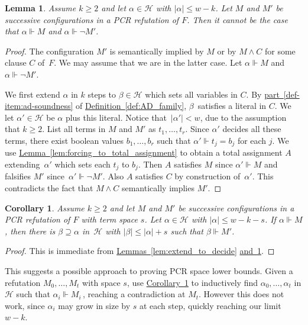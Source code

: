 \documentclass[11pt]{article}
\numberwithin{equation}{section}
\newtheorem{lemma}[theorem]{Lemma}
\newtheorem{corollary}[theorem]{Corollary}
\theoremstyle{definition}
\theoremstyle{plain}
\newcommand{\expref}[2]{\hyperref[#2]{#1~\ref{#2}}}
\newcommand\calH{\mathcal{H}}
\begin{document}
\begin{lemma}\label{lem:forcing-soundness}
Assume $k \ge 2$ and let $\alpha \in \calH$ with $|\alpha| \le w-k$. 
Let $M$ and $M'$ be successive configurations in a PCR refutation of $F$.
Then it cannot be the case that $\alpha \Vdash M$ and $\alpha \Vdash \neg M'$.
\end{lemma}

\begin{proof}
The configuration $M'$ is semantically implied by $M$ or by 
$M \land C$ for some clause $C$ of~$F$. 
We may assume that we are in the latter case.
Let $\alpha \Vdash M$ and $\alpha \Vdash \neg M'$.
 
We first extend $\alpha$ in 
$k$ steps to $\beta \in \calH$ which sets all variables in $C$.
By \expref{part}{def-item:ad-soundness}
of \expref{Definition}{def:AD_family}, $\beta$~satisfies a literal in $C$.
We let $\alpha' \in \calH$ be $\alpha$ plus this literal. 
Notice that~$|\alpha'| < w$, due to the assumption that $k \ge 2$.
List all terms in $M$ and $M'$ as $t_1, \ldots, t_r$.
Since $\alpha'$ decides all these terms, 
there exist boolean values $b_1, \ldots, b_{r}$ such that
$\alpha' \Vdash t_j = b_j$ for each $j$. 
We use \expref{Lemma}{lem:forcing_to_total_assignment}
to obtain a total assignment $A$ extending~$\alpha'$ 
which sets each $t_j$ to $b_j$. 
Then $A$ satisfies $M$ since $\alpha' \Vdash M$ 
and falsifies $M'$ since~$\alpha' \Vdash \neg M'$.
Also $A$ satisfies $C$
by  construction of~$\alpha'$. This contradicts
the fact that $M \wedge C$ semantically implies $M'$.
\end{proof}



\begin{corollary} \label{cor:extend_one_step}
Assume $k \ge 2$ and let $M$ and $M'$ be successive configurations in
a PCR refutation of $F$ with term space $s$.
Let $\alpha \in \calH$ with $|\alpha|\le w-k-s$.
If $\alpha \Vdash M$, then there is $\beta \supseteq \alpha$
in~$\calH$ with $|\beta| \le |\alpha|+s$ such that 
$\beta \Vdash M'$.
\end{corollary}

\begin{proof}
This is immediate from \expref{Lemmas}{lem:extend_to_decide}
\expref{and}{lem:forcing-soundness}.   %
\end{proof}

This suggests a possible approach to proving PCR space lower bounds.
Given a refutation $M_0, \dots, M_t$ with space $s$,
use \expref{Corollary}{cor:extend_one_step} to
inductively find $\alpha_0, \dots, \alpha_t$ in $\calH$
such that $\alpha_i \Vdash M_i$\,, reaching a contradiction
at $M_t$. However this does not work, since $\alpha_i$
may grow in size by $s$ at each step, quickly reaching
our limit $w-k$. 
\end{document}
